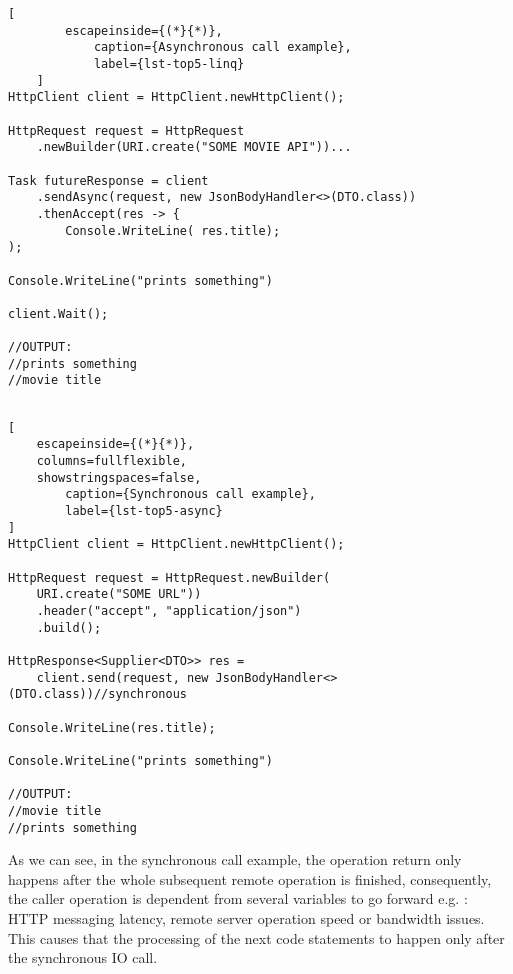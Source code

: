 \begin{center}
	\lstset{basicstyle=\scriptsize\ttfamily,frame=bottomline}
	\begin{minipage}[t][][b]{.46\textwidth}
	\begin{lstlisting}[
		escapeinside={(*}{*)},
			caption={Asynchronous call example},
			label={lst-top5-linq}
	]
HttpClient client = HttpClient.newHttpClient();

HttpRequest request = HttpRequest
	.newBuilder(URI.create("SOME MOVIE API"))...

Task futureResponse = client
	.sendAsync(request, new JsonBodyHandler<>(DTO.class)) 
	.thenAccept(res -> {
		Console.WriteLine( res.title);
); 

Console.WriteLine("prints something")

client.Wait();

//OUTPUT:
//prints something
//movie title
		
\end{lstlisting}
\end{minipage}
\hfill
\begin{minipage}{.48\textwidth}
\lstset{basicstyle=\scriptsize\ttfamily,frame=bottomline}
\begin{lstlisting}[
	escapeinside={(*}{*)},
	columns=fullflexible,
	showstringspaces=false,
		caption={Synchronous call example},
		label={lst-top5-async}
]
HttpClient client = HttpClient.newHttpClient();

HttpRequest request = HttpRequest.newBuilder(
	URI.create("SOME URL"))
	.header("accept", "application/json")
	.build();

HttpResponse<Supplier<DTO>> res = 
	client.send(request, new JsonBodyHandler<>(DTO.class))//synchronous

Console.WriteLine(res.title);

Console.WriteLine("prints something")

//OUTPUT:
//movie title
//prints something

		\end{lstlisting}
	\end{minipage}
\end{center}

	
	As we can see, in the synchronous call example, the operation return only happens after the whole subsequent remote operation is finished, consequently, the caller operation is dependent from several variables to go forward e.g. : HTTP messaging latency, remote server operation speed or bandwidth issues. 
	This causes that the processing of the next code statements to happen only after the synchronous IO call.

